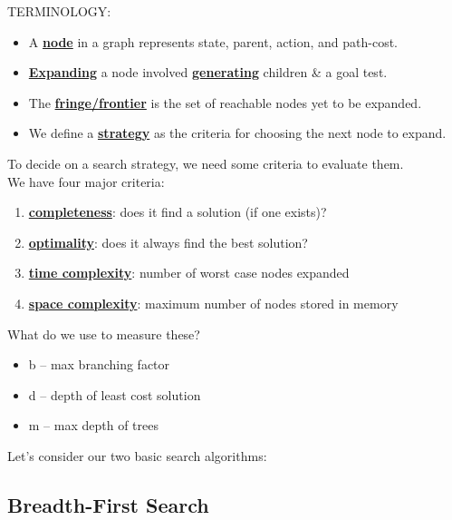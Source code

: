 \documentclass[../../lecture_notes.tex]{subfiles}
\begin{document}
\noindent TERMINOLOGY:
\begin{itemize} [itemsep=0mm]
	\item A \textbf{\underline{node}} in a graph represents state, parent, action, and path-cost.
	\item \textbf{\underline{Expanding}} a node involved \textbf{\underline{generating}} children \& a goal test.
	\item The \textbf{\underline{fringe/frontier}} is the set of reachable nodes yet to be expanded.
	\item We define a \textbf{\underline{strategy}} as the criteria for choosing the next node to expand.
\end{itemize} \medskip
	
To decide on a search strategy, we need some criteria to evaluate them.\\
\indent We have four major criteria:
	\begin{enumerate} [itemsep=0mm]
		\item \textbf{\underline{completeness}}: does it find a solution (if one exists)?
		\item \textbf{\underline{optimality}}: does it always find the best solution?
		\item \textbf{\underline{time complexity}}: number of worst case nodes expanded
		\item \textbf{\underline{space complexity}}: maximum number of nodes stored in memory
	\end{enumerate}
\noindent What do we use to measure these?
	\begin{itemize}
		\item b -- max branching factor
		\item d -- depth of least cost solution
		\item m -- max depth of trees
	\end{itemize}
Let’s consider our two basic search algorithms:

\subsection*{Breadth-First Search}
\end{document}
